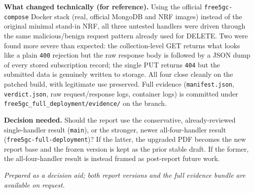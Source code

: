 \documentclass[11pt]{article}
\begin{document}
\vspace{0.5em}

\textbf{What changed technically (for reference).} Using the official \texttt{free5gc-compose} Docker stack (real, official MongoDB and NRF images) instead of the original minimal stand-in NRF, all three untested handlers were driven through the same malicious/benign request pattern already used for DELETE. Two were found more severe than expected: the collection-level GET returns what looks like a plain \texttt{400} rejection but the raw response body is followed by a JSON dump of every stored subscription record; the single PUT returns \texttt{404} but the submitted data is genuinely written to storage. All four close cleanly on the patched build, with legitimate use preserved. Full evidence (\texttt{manifest.json}, \texttt{verdict.json}, raw request/response logs, container logs) is committed under \texttt{free5gc\_full\_deployment/evidence/} on the branch.

\vspace{0.5em}

\textbf{Decision needed.} Should the report use the conservative, already-reviewed single-handler result (\texttt{main}), or the stronger, newer all-four-handler result (\texttt{free5gc-full-deployment})? If the latter, the upgraded PDF becomes the new report base and the frozen version is kept as the prior stable draft. If the former, the all-four-handler result is instead framed as post-report future work.

\vspace{0.5em}

\textit{Prepared as a decision aid; both report versions and the full evidence bundle are available on request.}
\end{document}

